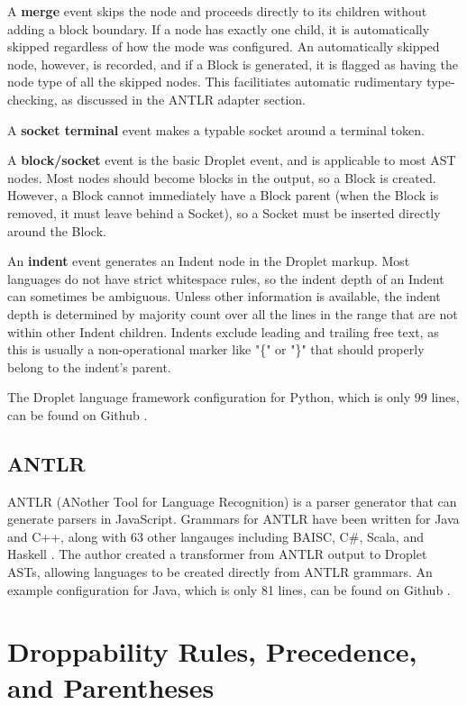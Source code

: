\documentclass[conference]{IEEEtran}
\begin{document}
A \textbf{merge} event skips the node and proceeds directly to its children without adding a block boundary. If a node has exactly one child, it is automatically skipped regardless of how the mode was configured. An automatically skipped node, however, is recorded, and if a Block is generated, it is flagged as having the node type of all the skipped nodes. This facilitiates automatic rudimentary type-checking, as discussed in the ANTLR adapter section.

A \textbf{socket terminal} event makes a typable socket around a terminal token.

A \textbf{block/socket} event is the basic Droplet event, and is applicable to most AST nodes. Most nodes should become blocks in the output, so a Block is created. However, a Block cannot immediately have a Block parent (when the Block is removed, it must leave behind a Socket), so a Socket must be inserted directly around the Block.

An \textbf{indent} event generates an Indent node in the Droplet markup. Most languages do not have strict whitespace rules, so the indent depth of an Indent can sometimes be ambiguous. Unless other information is available, the indent depth is determined by majority count over all the lines in the range that are not within other Indent children. Indents exclude leading and trailing free text, as this is usually a non-operational marker like "\{" or "\}" that should properly belong to the indent's parent.

The Droplet language framework configuration for Python, which is only 99 lines, can be found on Github \cite{PythonConfig}.

\subsection{ANTLR}
ANTLR (ANother Tool for Language Recognition) is a parser generator that can generate parsers in JavaScript. Grammars for ANTLR have been written for Java and C++, along with 63 other langauges including BAISC, C\#, Scala, and Haskell \cite{ANTLRGrammars}. The author created a transformer from ANTLR output to Droplet ASTs, allowing languages to be created directly from ANTLR grammars. An example configuration for Java, which is only 81 lines, can be found on Github \cite{JavaConfig}.

\section{Droppability Rules, Precedence, and Parentheses}
\end{document}
